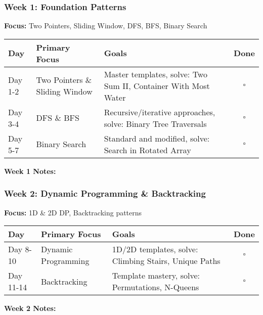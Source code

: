 \documentclass[10pt,a4paper]{article}
\begin{document}
\subsubsection{Week 1: Foundation Patterns}
\textbf{Focus:} Two Pointers, Sliding Window, DFS, BFS, Binary Search

\begin{table}[h]
\centering
\begin{tabular}{|p{2cm}|p{4cm}|p{6cm}|c|}
\hline
\textbf{Day} & \textbf{Primary Focus} & \textbf{Goals} & \textbf{Done} \\
\hline
Day 1-2 & Two Pointers \& Sliding Window & Master templates, solve: Two Sum II, Container With Most Water & $\square$ \\
\hline
Day 3-4 & DFS \& BFS & Recursive/iterative approaches, solve: Binary Tree Traversals & $\square$ \\
\hline
Day 5-7 & Binary Search & Standard and modified, solve: Search in Rotated Array & $\square$ \\
\hline
\end{tabular}
\end{table}

\textbf{Week 1 Notes:}\\

\subsubsection{Week 2: Dynamic Programming \& Backtracking}
\textbf{Focus:} 1D \& 2D DP, Backtracking patterns

\begin{table}[h]
\centering
\begin{tabular}{|p{2cm}|p{4cm}|p{6cm}|c|}
\hline
\textbf{Day} & \textbf{Primary Focus} & \textbf{Goals} & \textbf{Done} \\
\hline
Day 8-10 & Dynamic Programming & 1D/2D templates, solve: Climbing Stairs, Unique Paths & $\square$ \\
\hline
Day 11-14 & Backtracking & Template mastery, solve: Permutations, N-Queens & $\square$ \\
\hline
\end{tabular}
\end{table}

\textbf{Week 2 Notes:}\\
\end{document}
